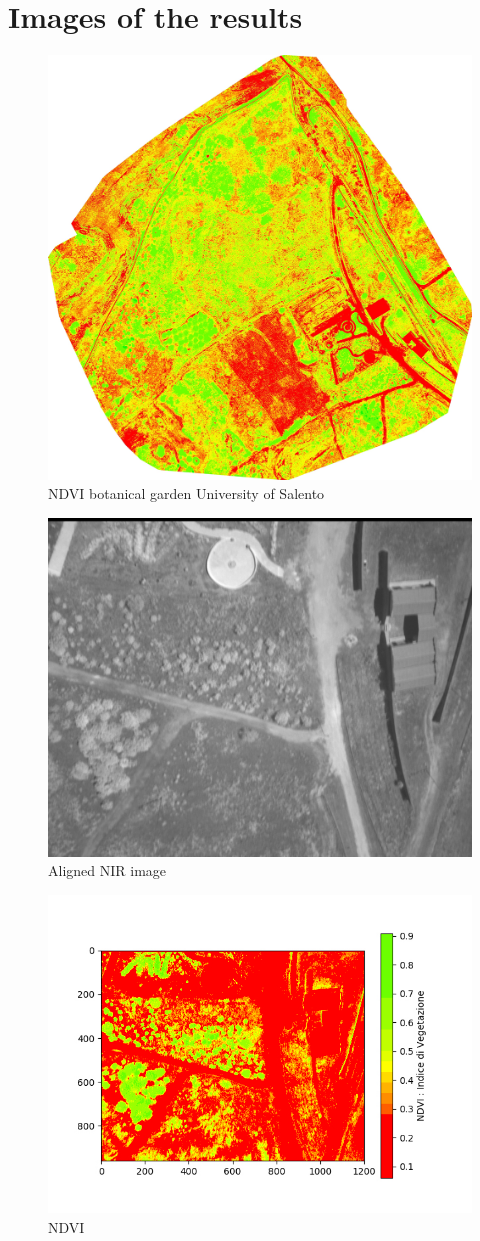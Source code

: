 \documentclass[a4paper,11pt,oneside]{book}
\begin{document}
\section*{Images of the results}
\begin{figure}[H]
	\centering
	\includegraphics[width=8 cm]{ortobotanicondvi.jpg}
	\caption{NDVI botanical garden University of Salento}
\end{figure}

\begin{figure}[H]
	\centering
	\includegraphics[width=9 cm]{niraligned.jpg}
	\caption{Aligned NIR image}
\end{figure}

\begin{figure}[H]
	\centering
	\includegraphics[width=12 cm]{NDVI.jpg}
	\caption{NDVI}
\end{figure}
\end{document}
